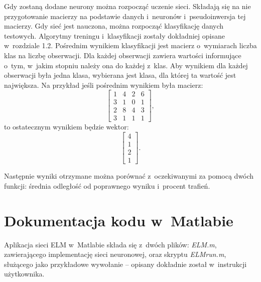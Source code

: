 \documentclass[pl]{minipw} %
\begin{document}
Gdy zostaną dodane neurony można rozpocząć uczenie sieci. 
Składają się na nie przygotowanie macierzy na podstawie danych i~neuronów i~pseudoinwersja tej macierzy. 
Gdy sieć jest nauczona, można rozpocząć klasyfikację danych testowych.
Algorytmy treningu i~klasyfikacji zostały dokładniej opisane w~rozdziale 1.2.
Pośrednim wynikiem klasyfikacji jest macierz o~wymiarach liczba klas na liczbę obserwacji.
Dla każdej obserwacji zawiera wartości informujące o~tym, w~jakim stopniu należy ona do każdej z~klas.
Aby wynikiem dla każdej obserwacji była jedna klasa, wybierana jest klasa, dla której ta wartość jest największa.
Na przykład jeśli pośrednim wynikiem była macierz:
\[ \begin{bmatrix} 1&4&2&6 \\ 3&1&0&1 \\ 2&8&4&3 \\ 3&1&1&1 \end{bmatrix},\]
to ostatecznym wynikiem będzie wektor:
\[ \begin{bmatrix} 4 \\ 1 \\ 2 \\ 1 \end{bmatrix}.\]

Następnie wyniki otrzymane można porównać z~oczekiwanymi za pomocą dwóch funkcji: średnia odległość od poprawnego wyniku i~procent trafień.

\section{Dokumentacja kodu w~Matlabie}
Aplikacja sieci ELM w~Matlabie składa się z~dwóch plików: \textit{ELM.m}, zawierającego implementację sieci neuronowej, oraz skryptu \textit{ELM\textunderscore run.m}, służącego jako przykładowe wywołanie -- opisany dokładnie został w~instrukcji użytkownika.
\end{document}
